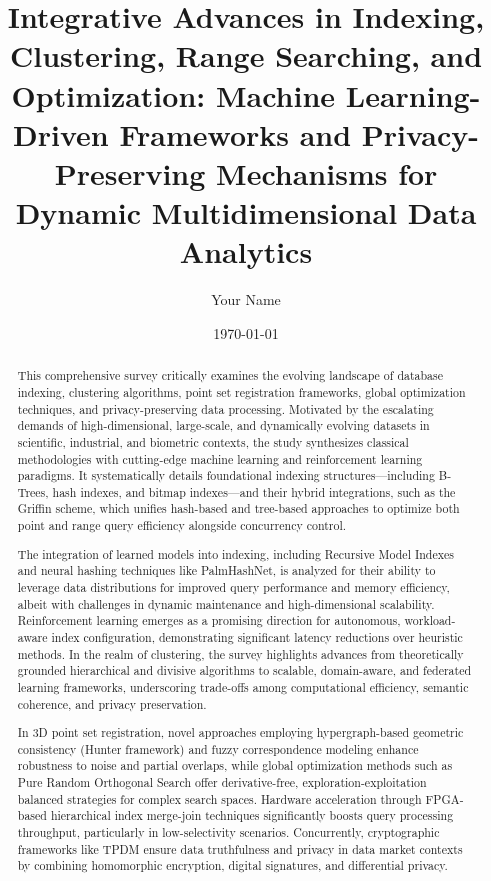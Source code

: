 \documentclass[11pt]{article}
\begin{document}
\author{Your Name}
\date{\today}

\title{\title{Integrative Advances in Indexing, Clustering, Range Searching, and Optimization: Machine Learning-Driven Frameworks and Privacy-Preserving Mechanisms for Dynamic Multidimensional Data Analytics}}
\maketitle

\begin{abstract}
This comprehensive survey critically examines the evolving landscape of database indexing, clustering algorithms, point set registration frameworks, global optimization techniques, and privacy-preserving data processing. Motivated by the escalating demands of high-dimensional, large-scale, and dynamically evolving datasets in scientific, industrial, and biometric contexts, the study synthesizes classical methodologies with cutting-edge machine learning and reinforcement learning paradigms. It systematically details foundational indexing structures—including B-Trees, hash indexes, and bitmap indexes—and their hybrid integrations, such as the Griffin scheme, which unifies hash-based and tree-based approaches to optimize both point and range query efficiency alongside concurrency control.

The integration of learned models into indexing, including Recursive Model Indexes and neural hashing techniques like PalmHashNet, is analyzed for their ability to leverage data distributions for improved query performance and memory efficiency, albeit with challenges in dynamic maintenance and high-dimensional scalability. Reinforcement learning emerges as a promising direction for autonomous, workload-aware index configuration, demonstrating significant latency reductions over heuristic methods. In the realm of clustering, the survey highlights advances from theoretically grounded hierarchical and divisive algorithms to scalable, domain-aware, and federated learning frameworks, underscoring trade-offs among computational efficiency, semantic coherence, and privacy preservation.

In 3D point set registration, novel approaches employing hypergraph-based geometric consistency (Hunter framework) and fuzzy correspondence modeling enhance robustness to noise and partial overlaps, while global optimization methods such as Pure Random Orthogonal Search offer derivative-free, exploration-exploitation balanced strategies for complex search spaces. Hardware acceleration through FPGA-based hierarchical index merge-join techniques significantly boosts query processing throughput, particularly in low-selectivity scenarios. Concurrently, cryptographic frameworks like TPDM ensure data truthfulness and privacy in data market contexts by combining homomorphic encryption, digital signatures, and differential privacy.


\end{abstract}
\end{document}
